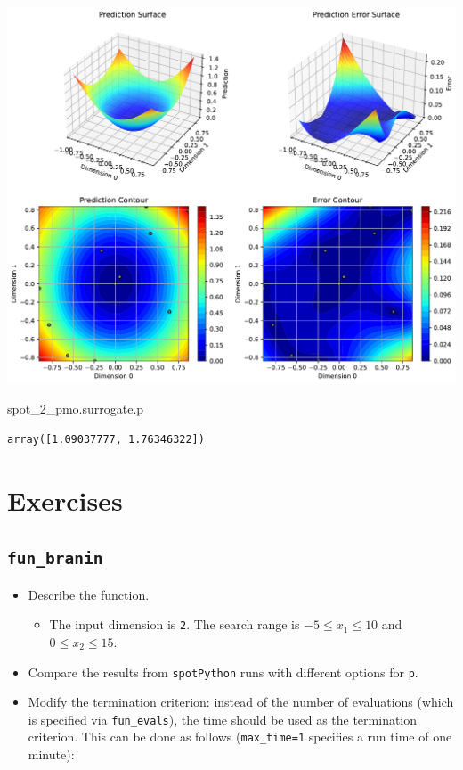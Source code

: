 \documentclass[
  letterpaper,
  DIV=11,
  numbers=noendperiod]{scrreprt}
\newenvironment{Shaded}{\begin{snugshade}}{\end{snugshade}}
\newcommand{\NormalTok}[1]{\textcolor[rgb]{0.00,0.23,0.31}{#1}}
\providecommand{\tightlist}{%
  \setlength{\itemsep}{0pt}\setlength{\parskip}{0pt}}\usepackage{longtable,booktabs,array}
\begin{document}
\includegraphics{015_num_spot_correlation_p_files/figure-pdf/cell-23-output-1.pdf}

\begin{Shaded}
\begin{Highlighting}[]
\NormalTok{spot\_2\_pmo.surrogate.p}
\end{Highlighting}
\end{Shaded}

\begin{verbatim}
array([1.09037777, 1.76346322])
\end{verbatim}

\section{Exercises}\label{exercises-8}

\subsection{\texorpdfstring{\texttt{fun\_branin}}{fun\_branin}}\label{fun_branin-1}

\begin{itemize}
\tightlist
\item
  Describe the function.

  \begin{itemize}
  \tightlist
  \item
    The input dimension is \texttt{2}. The search range is
    \(-5 \leq x_1 \leq 10\) and \(0 \leq x_2 \leq 15\).
  \end{itemize}
\item
  Compare the results from \texttt{spotPython} runs with different
  options for \texttt{p}.
\item
  Modify the termination criterion: instead of the number of evaluations
  (which is specified via \texttt{fun\_evals}), the time should be used
  as the termination criterion. This can be done as follows
  (\texttt{max\_time=1} specifies a run time of one minute):
\end{itemize}
\end{document}
